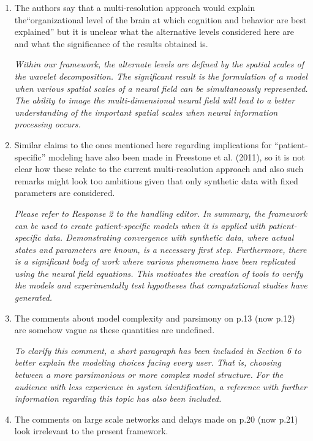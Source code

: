 \documentclass{article}
\begin{document}
\begin{enumerate}
        \item The authors say that a multi-resolution approach would explain the``organizational level of the brain at which cognition and behavior are best explained'' but it is unclear what the alternative levels considered here are and what the significance of the results obtained is.

\emph{Within our framework, the alternate levels are defined by the spatial scales of the wavelet decomposition. The significant result is the formulation of a model when various spatial scales of a neural field can be simultaneously represented. The ability to image the multi-dimensional neural field will lead to a better understanding of the important spatial scales when neural information processing occurs.}

		\item Similar claims to the ones mentioned here regarding implications for ``patient-specific'' modeling have also been made in Freestone et al. (2011), so it is not clear how these relate to the current multi-resolution approach and also such remarks might look too ambitious given that only synthetic data with fixed parameters are considered.
				
	\emph{Please refer to Response 2 to the handling editor. In summary, the framework can be used to create patient-specific models when it is applied with patient-specific data. Demonstrating convergence with synthetic data, where actual states and parameters are known, is a necessary first step. Furthermore, there is a significant body of work where various phenomena have been replicated using the neural field equations. This motivates the creation of tools to verify the models and experimentally test hypotheses that computational studies have generated.}
				
	\item The comments about model complexity and parsimony on p.13 (now p.12) are somehow vague as these quantities are undefined.
				
				
		\emph{To clarify this comment, a short paragraph has been included in Section 6 to better explain the modeling choices facing every user. That is, choosing between a more parsimonious or more complex model structure.  For the audience with less experience in system identification, a reference with further information regarding this topic has also been included.}
				
		\item The comments on large scale networks and delays made on p.20 (now p.21) look irrelevant to the present framework.
				

\end{enumerate}
\end{document}
